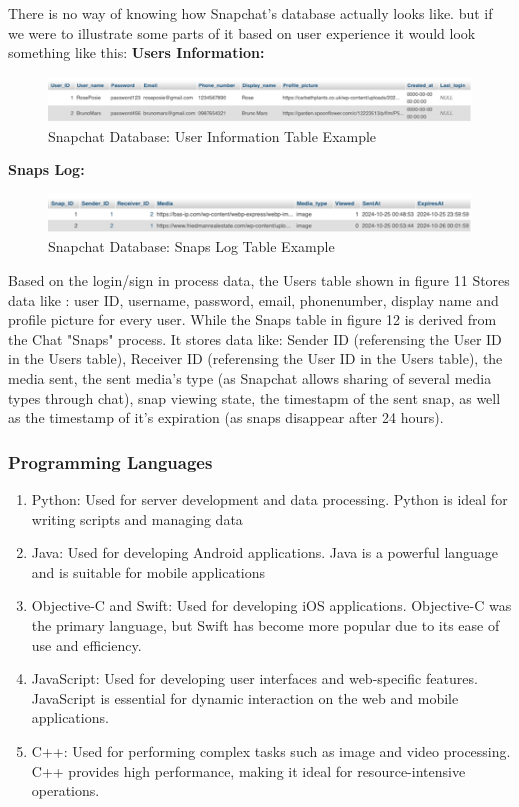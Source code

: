 \documentclass{article}
\begin{document}
There is no way of  knowing how Snapchat's database actually looks like. but if we were to illustrate some parts of it based on user experience it would look something like this: 
\newline
\newline
\textbf{Users Information:}
\begin{figure}[H]
    \centering
    \includegraphics[width=1\linewidth]{Picture1.png}
    \caption{Snapchat Database: User Information Table Example}
    \label{fig:User Information Table Example}
\end{figure}
\textbf{Snaps Log:}
\begin{figure}[H]
    \centering
    \includegraphics[width=1\linewidth]{Picture2.png}
    \caption{Snapchat Database: Snaps Log Table Example}
    \label{fig:Snaps Log Table Example}
\end{figure}

Based on the login/sign in process data, the Users table shown in figure 11 Stores data like : user ID, username, password, email, phonenumber, display name and profile picture for every user. While the Snaps table in figure 12 is derived from the Chat "Snaps" process. It stores data like: Sender ID (referensing the User ID in the Users table), Receiver ID (referensing the User ID in the Users table), the media sent, the sent media's type (as Snapchat allows sharing of several media types through chat), snap viewing state, the timestapm of the sent snap, as well as the timestamp of it's expiration (as snaps disappear after 24 hours).

\subsubsection{Programming Languages}
\begin{enumerate}
    \item Python:
 Used for server development and data processing. Python is ideal for writing scripts and managing data
    \item Java:
Used for developing Android applications. Java is a powerful language and is suitable for mobile applications
    \item Objective-C and Swift:
Used for developing iOS applications. Objective-C was the primary language, but Swift has become more popular due to its ease of use and efficiency.
    \item JavaScript:
Used for developing user interfaces and web-specific features. JavaScript is essential for dynamic interaction on the web and mobile applications.
    \item C++:
Used for performing complex tasks such as image and video processing. C++ provides high performance, making it ideal for resource-intensive operations.
\end{enumerate}
\end{document}
